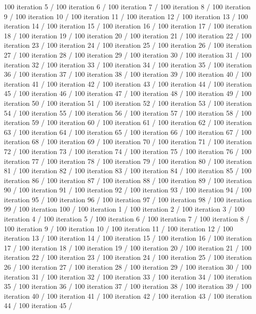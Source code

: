 100 iteration 5 / 100 iteration 6 / 100 iteration 7 / 100 iteration 8 /
100 iteration 9 / 100 iteration 10 / 100 iteration 11 / 100 iteration 12
/ 100 iteration 13 / 100 iteration 14 / 100 iteration 15 / 100 iteration
16 / 100 iteration 17 / 100 iteration 18 / 100 iteration 19 / 100
iteration 20 / 100 iteration 21 / 100 iteration 22 / 100 iteration 23 /
100 iteration 24 / 100 iteration 25 / 100 iteration 26 / 100 iteration
27 / 100 iteration 28 / 100 iteration 29 / 100 iteration 30 / 100
iteration 31 / 100 iteration 32 / 100 iteration 33 / 100 iteration 34 /
100 iteration 35 / 100 iteration 36 / 100 iteration 37 / 100 iteration
38 / 100 iteration 39 / 100 iteration 40 / 100 iteration 41 / 100
iteration 42 / 100 iteration 43 / 100 iteration 44 / 100 iteration 45 /
100 iteration 46 / 100 iteration 47 / 100 iteration 48 / 100 iteration
49 / 100 iteration 50 / 100 iteration 51 / 100 iteration 52 / 100
iteration 53 / 100 iteration 54 / 100 iteration 55 / 100 iteration 56 /
100 iteration 57 / 100 iteration 58 / 100 iteration 59 / 100 iteration
60 / 100 iteration 61 / 100 iteration 62 / 100 iteration 63 / 100
iteration 64 / 100 iteration 65 / 100 iteration 66 / 100 iteration 67 /
100 iteration 68 / 100 iteration 69 / 100 iteration 70 / 100 iteration
71 / 100 iteration 72 / 100 iteration 73 / 100 iteration 74 / 100
iteration 75 / 100 iteration 76 / 100 iteration 77 / 100 iteration 78 /
100 iteration 79 / 100 iteration 80 / 100 iteration 81 / 100 iteration
82 / 100 iteration 83 / 100 iteration 84 / 100 iteration 85 / 100
iteration 86 / 100 iteration 87 / 100 iteration 88 / 100 iteration 89 /
100 iteration 90 / 100 iteration 91 / 100 iteration 92 / 100 iteration
93 / 100 iteration 94 / 100 iteration 95 / 100 iteration 96 / 100
iteration 97 / 100 iteration 98 / 100 iteration 99 / 100 iteration 100 /
100 iteration 1 / 100 iteration 2 / 100 iteration 3 / 100 iteration 4 /
100 iteration 5 / 100 iteration 6 / 100 iteration 7 / 100 iteration 8 /
100 iteration 9 / 100 iteration 10 / 100 iteration 11 / 100 iteration 12
/ 100 iteration 13 / 100 iteration 14 / 100 iteration 15 / 100 iteration
16 / 100 iteration 17 / 100 iteration 18 / 100 iteration 19 / 100
iteration 20 / 100 iteration 21 / 100 iteration 22 / 100 iteration 23 /
100 iteration 24 / 100 iteration 25 / 100 iteration 26 / 100 iteration
27 / 100 iteration 28 / 100 iteration 29 / 100 iteration 30 / 100
iteration 31 / 100 iteration 32 / 100 iteration 33 / 100 iteration 34 /
100 iteration 35 / 100 iteration 36 / 100 iteration 37 / 100 iteration
38 / 100 iteration 39 / 100 iteration 40 / 100 iteration 41 / 100
iteration 42 / 100 iteration 43 / 100 iteration 44 / 100 iteration 45 /
